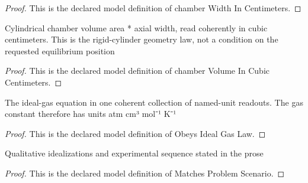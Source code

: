 \begin{proof}
  This is the declared model definition of chamber Width In Centimeters.
\end{proof}
\begin{definition}
  \label{def:physics:phyx-mini-0359:phyxminiproblems-problemphyxmini0359-chambervolumeincubiccentimeters}
  Cylindrical chamber volume area * axial width, read coherently in cubic centimeters. This is the rigid-cylinder geometry law, not a condition on the requested equilibrium position
\end{definition}
\begin{proof}
  This is the declared model definition of chamber Volume In Cubic Centimeters.
\end{proof}
\begin{definition}
  \label{def:physics:phyx-mini-0359:phyxminiproblems-problemphyxmini0359-obeysidealgaslaw}
  The ideal-gas equation in one coherent collection of named-unit readouts. The gas constant therefore has units atm cm³ mol⁻¹ K⁻¹
\end{definition}
\begin{proof}
  This is the declared model definition of Obeys Ideal Gas Law.
\end{proof}
\begin{definition}
  \label{def:physics:phyx-mini-0359:phyxminiproblems-problemphyxmini0359-matchesproblemscenario}
  Qualitative idealizations and experimental sequence stated in the prose
\end{definition}
\begin{proof}
  This is the declared model definition of Matches Problem Scenario.
\end{proof}

